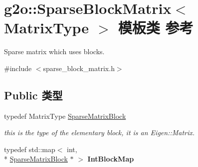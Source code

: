 \hypertarget{classg2o_1_1SparseBlockMatrix}{\section{g2o\-:\-:Sparse\-Block\-Matrix$<$ Matrix\-Type $>$ 模板类 参考}
\label{classg2o_1_1SparseBlockMatrix}
}


Sparse matrix which uses blocks.  




{\ttfamily \#include $<$sparse\-\_\-block\-\_\-matrix.\-h$>$}

\subsection*{Public 类型}
\begin{DoxyCompactItemize}
\item 
\hypertarget{classg2o_1_1SparseBlockMatrix_ab2f7376cbf055803fda6527dcc43e3be}{typedef Matrix\-Type \hyperlink{classg2o_1_1SparseBlockMatrix_ab2f7376cbf055803fda6527dcc43e3be}{Sparse\-Matrix\-Block}}\label{classg2o_1_1SparseBlockMatrix_ab2f7376cbf055803fda6527dcc43e3be}

\begin{DoxyCompactList}\small\item\em this is the type of the elementary block, it is an Eigen\-::\-Matrix. \end{DoxyCompactList}\item 
\hypertarget{classg2o_1_1SparseBlockMatrix_aaa6ca1ae454ed70f62992b6401645f4e}{typedef std\-::map$<$ int, \\*
\hyperlink{classg2o_1_1SparseBlockMatrix_ab2f7376cbf055803fda6527dcc43e3be}{Sparse\-Matrix\-Block} $\ast$ $>$ {\bfseries Int\-Block\-Map}}\label{classg2o_1_1SparseBlockMatrix_aaa6ca1ae454ed70f62992b6401645f4e}

\end{DoxyCompactItemize}
